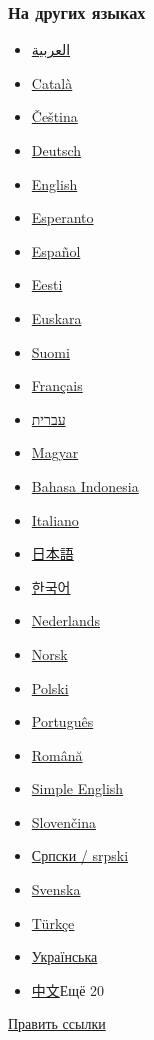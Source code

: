 \documentclass[a4paper,11pt]{article}
\begin{document}
\subsubsection{На других языках}
\begin{itemize}
	\item \href{https://ar.wikipedia.org/wiki/%D8%A5%D9%86%D8%AA%D9%84_%D8%B2%D9%8A%D9%88%D9%86}{العربية}
	\item \href{https://ca.wikipedia.org/wiki/Xeon}{Català}
	\item \href{https://cs.wikipedia.org/wiki/Xeon}{Čeština}
	\item \href{https://de.wikipedia.org/wiki/Intel_Xeon}{Deutsch}
	\item \href{https://en.wikipedia.org/wiki/Xeon}{English}
	\item \href{https://eo.wikipedia.org/wiki/Xeon}{Esperanto}
	\item \href{https://es.wikipedia.org/wiki/Intel_Xeon}{Español}
	\item \href{https://et.wikipedia.org/wiki/Xeon}{Eesti}
	\item \href{https://eu.wikipedia.org/wiki/Intel_Xeon}{Euskara}
	\item \href{https://fi.wikipedia.org/wiki/Intel_Xeon}{Suomi}
	\item \href{https://fr.wikipedia.org/wiki/Xeon}{Français}
	\item \href{https://he.wikipedia.org/wiki/Xeon}{עברית}
	\item \href{https://hu.wikipedia.org/wiki/Xeon}{Magyar}
	\item \href{https://id.wikipedia.org/wiki/Intel_Xeon}{Bahasa Indonesia}
	\item \href{https://it.wikipedia.org/wiki/Xeon}{Italiano}
	\item \href{https://ja.wikipedia.org/wiki/Xeon}{日本語}
	\item \href{https://ko.wikipedia.org/wiki/%EC%A0%9C%EC%98%A8}{한국어}
	\item \href{https://nl.wikipedia.org/wiki/Xeon}{Nederlands}
	\item \href{https://no.wikipedia.org/wiki/Xeon}{Norsk}
	\item \href{https://pl.wikipedia.org/wiki/Xeon}{Polski}
	\item \href{https://pt.wikipedia.org/wiki/Xeon}{Português}
	\item \href{https://ro.wikipedia.org/wiki/Xeon}{Română}
	\item \href{https://simple.wikipedia.org/wiki/Xeon}{Simple English}
	\item \href{https://sk.wikipedia.org/wiki/Xeon}{Slovenčina}
	\item \href{https://sr.wikipedia.org/wiki/Xeon}{Српски / srpski}
	\item \href{https://sv.wikipedia.org/wiki/Xeon}{Svenska}
	\item \href{https://tr.wikipedia.org/wiki/Intel_Xeon}{Türkçe}
	\item \href{https://uk.wikipedia.org/wiki/Xeon}{Українська}
	\item \href{https://zh.wikipedia.org/wiki/%E8%87%B3%E5%BC%BA}{中文}Ещё 20
\end{itemize}\href{https://www.wikidata.org/wiki/Special:EntityPage/Q656154#sitelinks-wikipedia}{Править ссылки}
\end{document}
